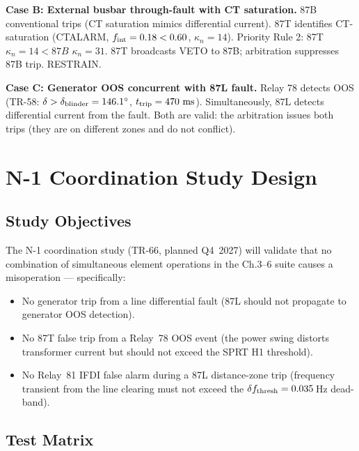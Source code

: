 \textbf{Case B: External busbar through-fault with CT saturation.}
87B conventional trips (CT saturation mimics differential current).
87T identifies CT-saturation (CTALARM, $f_{\rm int} = 0.18 < 0.60$,
$\kappa_n = 14$).
Priority Rule 2: 87T $\kappa_n = 14 < 87B$ $\kappa_n = 31$.
87T broadcasts VETO to 87B; arbitration suppresses 87B trip. RESTRAIN.

\textbf{Case C: Generator OOS concurrent with 87L fault.}
Relay 78 detects OOS (TR-58: $\delta > \delta_{\rm blinder} = 146.1^\circ$,
$t_{\rm trip} = 470\,\,\mathrm{ms}$).
Simultaneously, 87L detects differential current from the fault.
Both are valid: the arbitration issues both trips (they are on different
zones and do not conflict).

\section{N-1 Coordination Study Design}
\label{sec:ch7_n1}

\subsection{Study Objectives}

The N-1 coordination study (TR-66, planned Q4~2027) will validate that no
combination of simultaneous element operations in the Ch.3--6 suite causes
a misoperation — specifically:
\begin{itemize}
  \item No generator trip from a line differential fault (87L should not
    propagate to generator OOS detection).
  \item No 87T false trip from a Relay~78 OOS event (the power swing
    distorts transformer current but should not exceed the SPRT H1 threshold).
  \item No Relay~81 IFDI false alarm during a 87L distance-zone trip
    (frequency transient from the line clearing must not exceed the
    $\delta f_{\rm thresh} = 0.035$\,Hz dead-band).
\end{itemize}

\subsection{Test Matrix}

